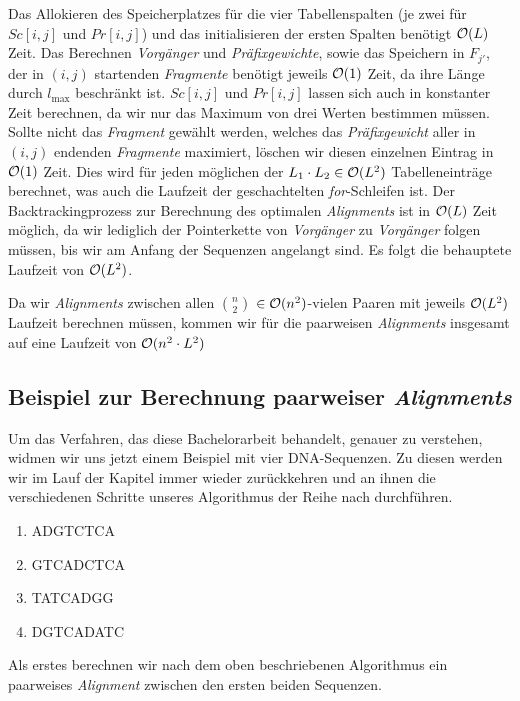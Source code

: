 \begin{beweis}
	Das Allokieren des Speicherplatzes für die vier Tabellenspalten (je zwei für $Sc[i,j]$ und $Pr[i,j]$) und das initialisieren der ersten Spalten benötigt $\mathcal{O}(L)$ Zeit. Das Berechnen \emph{Vorgänger} und \emph{Präfixgewichte}, sowie das Speichern in $F_{j'}$, der in $(i,j)$ startenden \emph{Fragmente} benötigt jeweils $\mathcal{O}(1)$ Zeit, da ihre Länge durch $l_{\max}$ beschränkt ist. $Sc[i,j]$ und $Pr[i,j]$ lassen sich auch in konstanter Zeit berechnen, da wir nur das Maximum von drei Werten bestimmen müssen. Sollte nicht das \emph{Fragment} gewählt werden, welches das \emph{Präfixgewicht} aller in $(i,j)$ endenden \emph{Fragmente} maximiert, löschen wir diesen einzelnen Eintrag in $\mathcal{O}(1)$ Zeit. Dies wird für jeden möglichen der $L_1 \cdot L_2 \in \mathcal{O}(L^2)$ Tabelleneinträge berechnet, was auch die Laufzeit der geschachtelten \emph{for}-Schleifen ist.
	Der Backtrackingprozess zur Berechnung des optimalen \emph{Alignments} ist in $\mathcal{O}(L)$ Zeit möglich, da wir lediglich der Pointerkette von \emph{Vorgänger} zu \emph{Vorgänger} folgen müssen, bis wir am Anfang der Sequenzen angelangt sind.
	Es folgt die behauptete Laufzeit von $\mathcal{O}(L^2)$.
\end{beweis}

Da wir \emph{Alignments} zwischen allen ${n}\choose{2}$ $\in \mathcal{O}(n^2)$-vielen Paaren mit jeweils $\mathcal{O}(L^2)$ Laufzeit berechnen müssen, kommen wir für die paarweisen \emph{Alignments} insgesamt auf eine Laufzeit von $\mathcal{O}(n^2\cdot L^2)$

\subsection{Beispiel zur Berechnung paarweiser \emph{Alignments}} 
Um das Verfahren, das diese Bachelorarbeit behandelt, genauer zu verstehen, widmen wir uns jetzt einem Beispiel mit vier DNA-Sequenzen. Zu diesen werden wir im Lauf der Kapitel immer wieder zurückkehren und an ihnen die verschiedenen Schritte unseres Algorithmus der Reihe nach durchführen.
\ttfamily
\begin{enumerate}[topsep=0pt,itemsep=-1ex,partopsep=1ex,parsep=1ex]
	\item ADGTCTCA
	\item GTCADCTCA
	\item TATCADGG
	\item DGTCADATC
\end{enumerate}
\normalfont
Als erstes berechnen wir nach dem oben beschriebenen Algorithmus ein paarweises \emph{Alignment} zwischen den ersten beiden Sequenzen.


